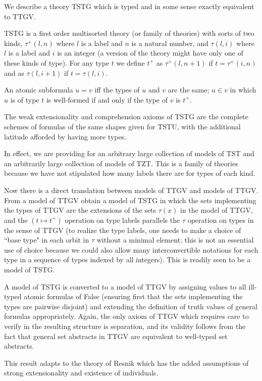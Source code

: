 \documentclass[12pt]{article}
\begin{document}
We describe a theory TSTG which is typed and in some sense exactly equivalent to TTGV.

TSTG is a first order multisorted theory (or family of theories) with sorts of two kinds, $\tau^+(l,n)$ where $l$ is a label and $n$ is a natural number, and $\tau(l,i)$ where $l$ is a label and $i$ is an integer (a version of the theory might have only one of these kinds of type).  For any type $t$ we define $t^+$ as $\tau^+(l,n+1)$ if $t=\tau^+(i,n)$ and as $\tau(l,i+1)$ if $t=\tau(l,i)$.  

An atomic subformula $u=v$ iff the types of $u$ and $v$ are the same; $u \in v$ in which $u$ is of type $t$ is well-formed if and only if the type of $v$ is $t^+$.

The weak extensionality and comprehension axioms of TSTG are the complete schemes of formulas of the same shapes given for TSTU, with the additional latitude afforded by having more types.

In effect, we are providing for an arbitrary large collection of models of TST and an arbitrarily large collection of models of TZT.  This is a family of theories because we have not stipulated how many labels there are for types of each kind.

Now there is a direct translation between models of TTGV and models of TTGV.  From a model of TTGV obtain a model of TSTG in which the sets implementing the types of TTGV are the extensions of the sets $\tau(x)$ in the model of TTGV, and the $(t \mapsto t^+)$ operation on type labels parallels the $\tau$ operation on types in the sense of TTGV (to realize the type labels, one needs to make a choice of ``base type" in each orbit in $\tau$ without a minimal element;  this is not an essential use of choice because we could also allow many interconvertible notations for each type in a sequence of types indexed by all integers).  This is readily seen to be a model of TSTG.

A model of TSTG is converted to a model of TTGV by assigning values to all ill-typed atomic formulas of False
(ensuring first that the sets implementing the types are pairwise disjoint) and extending the definition of truth values of general formulas appropriately.  Again, the only axiom of TTGV which requires care to verify in the resulting structure is separation, and its validity follows from the fact
that general set abstracts in TTGV are equivalent to well-typed set abstracts.

This result adapts to the theory of Resnik which has the added assumptions of strong extensionality and existence of individuals.
\end{document}
